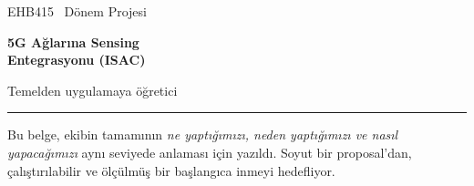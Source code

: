 \begin{titlepage}
\thispagestyle{empty}
\vspace*{1.2cm}
{\sffamily\color{muted}\large EHB415 \textbullet\ Dönem Projesi}\par
\vspace{0.4cm}
{\sffamily\bfseries\fontsize{30}{34}\selectfont\color{acc} 5G Ağlarına Sensing\\[2pt] Entegrasyonu (ISAC)}\par
\vspace{0.3cm}
{\sffamily\Large Temelden uygulamaya öğretici}\par
\vspace{0.7cm}
{\color{acc!35}\rule{\textwidth}{1.4pt}}\par
\vspace{0.5cm}

\begin{minipage}[t]{0.62\textwidth}
\sffamily\normalsize
Bu belge, ekibin tamamının \emph{ne yaptığımızı, neden yaptığımızı ve nasıl yapacağımızı} aynı seviyede anlaması için yazıldı.
Soyut bir proposal'dan, çalıştırılabilir ve ölçülmüş bir başlangıca inmeyi hedefliyor.


\end{minipage}
\end{titlepage}
